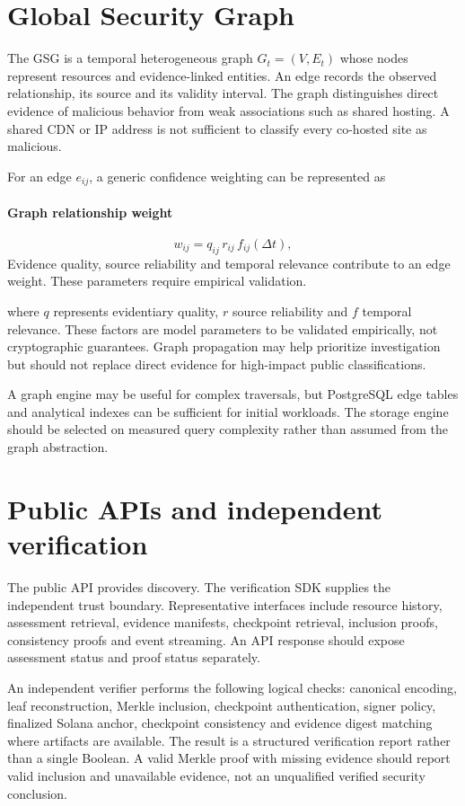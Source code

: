 \documentclass[10pt,a4paper]{article}
\begin{document}
\section*{Global Security Graph}
The GSG is a temporal heterogeneous graph \(G_t=(V,E_t)\) whose nodes represent resources and evidence-linked entities. An edge records the observed relationship, its source and its validity interval. The graph distinguishes direct evidence of malicious behavior from weak associations such as shared hosting. A shared CDN or IP address is not sufficient to classify every co-hosted site as malicious.


For an edge \(e_{ij}\), a generic confidence weighting can be represented as


\paragraph{Graph relationship weight}
\[w_{ij}=q_{ij}\,r_{ij}\,f_{ij}(\Delta t),\]
Evidence quality, source reliability and temporal relevance contribute to an edge weight. These parameters require empirical validation.


where \(q\) represents evidentiary quality, \(r\) source reliability and \(f\) temporal relevance. These factors are model parameters to be validated empirically, not cryptographic guarantees. Graph propagation may help prioritize investigation but should not replace direct evidence for high-impact public classifications.


A graph engine may be useful for complex traversals, but PostgreSQL edge tables and analytical indexes can be sufficient for initial workloads. The storage engine should be selected on measured query complexity rather than assumed from the graph abstraction.


\section*{Public APIs and independent verification}
The public API provides discovery. The verification SDK supplies the independent trust boundary. Representative interfaces include resource history, assessment retrieval, evidence manifests, checkpoint retrieval, inclusion proofs, consistency proofs and event streaming. An API response should expose assessment status and proof status separately.


An independent verifier performs the following logical checks: canonical encoding, leaf reconstruction, Merkle inclusion, checkpoint authentication, signer policy, finalized Solana anchor, checkpoint consistency and evidence digest matching where artifacts are available. The result is a structured verification report rather than a single Boolean. A valid Merkle proof with missing evidence should report valid inclusion and unavailable evidence, not an unqualified verified security conclusion.
\end{document}
